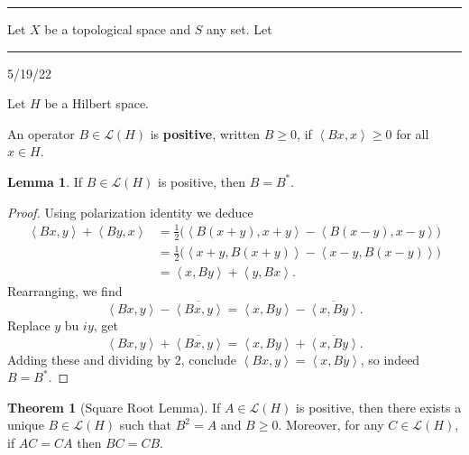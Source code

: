 \documentclass[12pt]{article}
\newcommand{\keyword}[1]{\textbf{#1}}
\newcommand{\sepline}{\rule{\textwidth}{0.4pt}}
\theoremstyle{definition}
\newtheorem{theorem}{Theorem}
\newtheorem{lemma}{Lemma}
\newcommand{\LL}{\mathcal{L}}
\newcommand{\<}{\left\langle}
\renewcommand{\>}{\right\rangle}
\newcommand{\conj}{\overline}
\begin{document}
\sepline

Let $X$ be a topological space and $S$ any set.
Let 


\newpage

\sepline

5/19/22

Let $H$ be a Hilbert space.

An operator $B \in \LL(H)$ is \keyword{positive}, written $B \geq 0$, if $\<Bx, x\> \geq 0$ for all $x \in H$.

\begin{lemma}
    If $B \in \LL(H)$ is positive, then $B = B^*$.
\end{lemma}

\begin{proof}
    Using polarization identity we deduce
    \begin{align*}
        \<Bx, y\> + \<By, x\>
            &= \frac{1}{2}\big(\<B(x + y), x + y\> - \<B(x - y), x - y\>\big) \\
            &= \frac{1}{2}\big(\<x+ y, B(x + y)\> - \<x - y, B(x - y)\>\big) \\
            &= \<x, By\> + \<y, Bx\>.
    \end{align*}
    Rearranging, we find
    \[
        \<Bx, y\> - \conj{\<Bx, y\>}
            = \<x, By\> - \conj{\<x, By\>}.
    \]
    Replace $y$ bu $iy$, get
    \[
        \<Bx, y\> + \conj{\<Bx, y\>}
            = \<x, By\> + \conj{\<x, By\>}.
    \]
    Adding these and dividing by $2$, conclude $\<Bx, y\> = \<x, By\>$, so indeed $B = B^*$.
\end{proof}

\begin{theorem}[Square Root Lemma]
    If $A \in \LL(H)$ is positive, then there exists a unique $B \in \LL(H)$ such that $B^2 = A$ and $B \geq 0$.
    Moreover, for any $C \in \LL(H)$, if $AC = CA$ then $BC = CB$.
\end{theorem}
\end{document}
